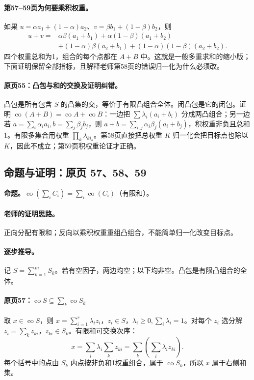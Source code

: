 \documentclass[11pt,a4paper]{article}
\theoremstyle{definition}\newtheorem{definition}{定义}\newtheorem{example}{例}
\begin{document}
\paragraph{第57--59页为何要乘积权重。}
如果 $u=\alpha a_1+(1-\alpha)a_2$、$v=\beta b_1+(1-\beta)b_2$，则
\begin{align*}
u+v={}&\alpha\beta(a_1+b_1)+\alpha(1-\beta)(a_1+b_2)\\
&+(1-\alpha)\beta(a_2+b_1)+(1-\alpha)(1-\beta)(a_2+b_2).
\end{align*}
四个权重总和为1，组合的每个点都在 $A+B$ 中。这就是一般多重求和的缩小版；下面证明保留全部指标，且解释老师第58页的错误归一化为什么必须改。


\paragraph{原页55：凸包与和的交换及证明纠错。}凸包是所有包含 $S$ 的凸集的交，等价于有限凸组合全体。闭凸包是它的闭包。证明 $\operatorname{co}(A+B)=\operatorname{co}A+\operatorname{co}B$：一边把 $\sum\lambda_i(a_i+b_i)$ 分成两凸组合；另一边若 $a=\sum_i\alpha_i a_i,b=\sum_j\beta_j b_j$，则 $a+b=\sum_{i,j}\alpha_i\beta_j(a_i+b_j)$，积权重非负且总和1。有限多集合用权重 $\prod_k\lambda_{ki_k}$。第58页直接把总权重 $K$ 归一化会把目标点也除以 $K$，因此不成立；第59页积权重论证才正确。



\subsection{命题与证明：原页 57、58、59}

\textbf{命题。}$\operatorname{co}(\sum_i C_i)=\sum_i\operatorname{co}(C_i)$（有限和）。

\paragraph{老师的证明思路。}正向分配有限和；反向以乘积权重重组凸组合，不能简单归一化改变目标点。

\paragraph{逐步推导。}
记 $S=\sum_{k=1}^m S_k$。若有空因子，两边均空；以下均非空。凸包是有限凸组合的全体。
\paragraph{原页57：$\operatorname{co}S\subseteq\sum_k\operatorname{co}S_k$}
取 $x\in\operatorname{co}S$，则 $x=\sum_{i=1}^r\lambda_i z_i$，$z_i\in S$，$\lambda_i\ge0,\sum_i\lambda_i=1$。对每个 $z_i$ 选分解 $z_i=\sum_kz_{ki}$，$z_{ki}\in S_k$。有限和可交换次序：
\[x=\sum_i\lambda_i\sum_kz_{ki}=\sum_k\left(\sum_i\lambda_i z_{ki}\right).\]
每个括号中的点由 $S_k$ 内点按非负和1权重组合，属于 $\operatorname{co}S_k$，所以 $x$ 属于右侧和集。
\end{document}
